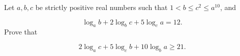 Let $a, b, c$ be strictly positive real numbers such that $1 < b \le c^2 \le a^{10}$, and

\[\log_ab + 2\log_bc + 5\log_ca = 12.\]
Prove that

\[2\log_ac + 5\log_cb + 10\log_ba \ge 21.\]